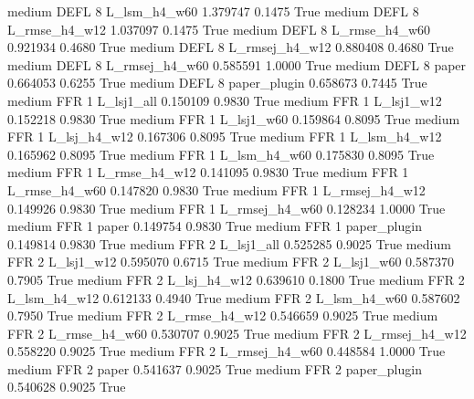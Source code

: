     medium     DEFL                 8   L_lsm_h4_w60   1.379747      0.1475    True
    medium     DEFL                 8  L_rmse_h4_w12   1.037097      0.1475    True
    medium     DEFL                 8  L_rmse_h4_w60   0.921934      0.4680    True
    medium     DEFL                 8 L_rmsej_h4_w12   0.880408      0.4680    True
    medium     DEFL                 8 L_rmsej_h4_w60   0.585591      1.0000    True
    medium     DEFL                 8          paper   0.664053      0.6255    True
    medium     DEFL                 8   paper_plugin   0.658673      0.7445    True
    medium      FFR                 1     L_lsj1_all   0.150109      0.9830    True
    medium      FFR                 1     L_lsj1_w12   0.152218      0.9830    True
    medium      FFR                 1     L_lsj1_w60   0.159864      0.8095    True
    medium      FFR                 1   L_lsj_h4_w12   0.167306      0.8095    True
    medium      FFR                 1   L_lsm_h4_w12   0.165962      0.8095    True
    medium      FFR                 1   L_lsm_h4_w60   0.175830      0.8095    True
    medium      FFR                 1  L_rmse_h4_w12   0.141095      0.9830    True
    medium      FFR                 1  L_rmse_h4_w60   0.147820      0.9830    True
    medium      FFR                 1 L_rmsej_h4_w12   0.149926      0.9830    True
    medium      FFR                 1 L_rmsej_h4_w60   0.128234      1.0000    True
    medium      FFR                 1          paper   0.149754      0.9830    True
    medium      FFR                 1   paper_plugin   0.149814      0.9830    True
    medium      FFR                 2     L_lsj1_all   0.525285      0.9025    True
    medium      FFR                 2     L_lsj1_w12   0.595070      0.6715    True
    medium      FFR                 2     L_lsj1_w60   0.587370      0.7905    True
    medium      FFR                 2   L_lsj_h4_w12   0.639610      0.1800    True
    medium      FFR                 2   L_lsm_h4_w12   0.612133      0.4940    True
    medium      FFR                 2   L_lsm_h4_w60   0.587602      0.7950    True
    medium      FFR                 2  L_rmse_h4_w12   0.546659      0.9025    True
    medium      FFR                 2  L_rmse_h4_w60   0.530707      0.9025    True
    medium      FFR                 2 L_rmsej_h4_w12   0.558220      0.9025    True
    medium      FFR                 2 L_rmsej_h4_w60   0.448584      1.0000    True
    medium      FFR                 2          paper   0.541637      0.9025    True
    medium      FFR                 2   paper_plugin   0.540628      0.9025    True
